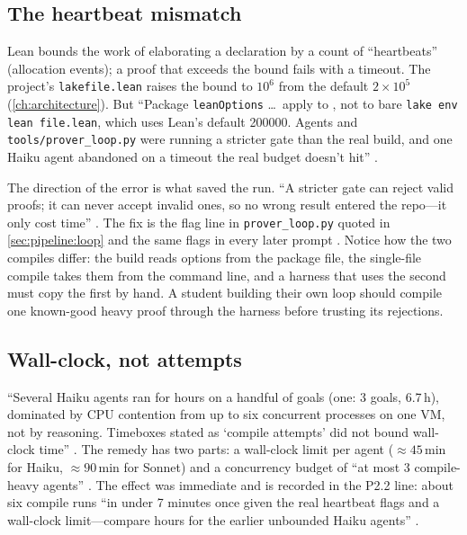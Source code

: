 \subsection{The heartbeat mismatch}\label{sec:pipeline:heartbeat}

Lean bounds the work of elaborating a declaration by a count of ``heartbeats''
(allocation events); a proof that exceeds the bound fails with a timeout. The project's
\texttt{lakefile.lean} raises the bound to $10^6$ from the default $2\times10^5$
(\cref{ch:architecture}). But ``Package \texttt{leanOptions} \ldots\ apply to , not to bare \texttt{lake env lean file.lean}, which uses Lean's default 200000. Agents
and \texttt{tools/prover\_loop.py} were running a stricter gate than the real build, and one
Haiku agent abandoned  on a timeout the real budget doesn't hit''
.

The direction of the error is what saved the run. ``A stricter gate can reject valid
proofs; it can never accept invalid ones, so no wrong result entered the repo---it only
cost time'' . The fix is the flag line in
\texttt{prover\_loop.py} quoted in \cref{sec:pipeline:loop} and the same flags in every later
prompt . Notice how the two compiles differ:
the build reads options from the package file, the single-file compile takes them from the
command line, and a harness that uses the second must copy the first by hand. A student
building their own loop should compile one known-good heavy proof through the harness
before trusting its rejections.

\subsection{Wall-clock, not attempts}\label{sec:pipeline:wallclock}

``Several Haiku agents ran for hours on a handful of goals (one: 3 goals, 6.7\,h),
dominated by CPU contention from up to six concurrent  processes on one VM, not
by reasoning. Timeboxes stated as `compile attempts' did not bound wall-clock time''
. The remedy has two parts: a wall-clock
limit per agent ($\approx45$\,min for Haiku, $\approx90$\,min for Sonnet) and a concurrency
budget of ``at most 3 compile-heavy agents'' . The
effect was immediate and is recorded in the P2.2 line: about six compile runs ``in under 7
minutes once given the real heartbeat flags and a wall-clock limit---compare hours for the
earlier unbounded Haiku agents'' .

